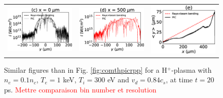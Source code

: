 \documentclass[%
 reprint,
 amsmath,amssymb,
 aps,
]{revtex4-1}
\begin{document}
\begin{figure}
\begin{tabular}{ccc}
\includegraphics[scale=0.39]{Figure/Icut0_te1keV_Ti300eV_.eps}
&\includegraphics[scale=0.39]{Figure/Icut500_te1keV_Ti300eV_.eps}
&\includegraphics[scale=0.39]{Figure/ymoy_te1keV_Ti300eV_.eps}
\end{tabular}
\caption{ \label{fig:comthpicrpp3} 
Similar figures than in Fig. \ref{fig:comthpicrpp} for a  H$^{+}$-plasma with $n_e=0.1n_c$, $T_e=1$ keV, $T_i=300$ eV and $v_d=0.84 c_s$, at time $t = 20$ ps.
 \textcolor{red}{Mettre comparaison bin number et resolution}}
\end{figure}
\end{document}
